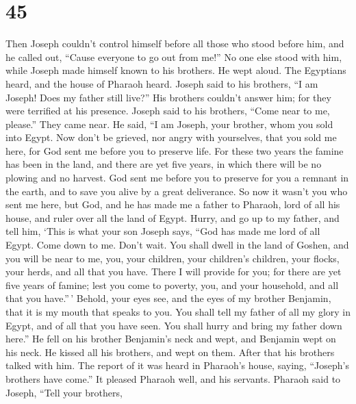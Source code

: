 \hypertarget{section-44}{%
\section{45}\label{section-44}}

 Then Joseph couldn't control himself before all those who
stood before him, and he called out, ``Cause everyone to go out from
me!'' No one else stood with him, while Joseph made himself known to his
brothers.  He wept aloud. The Egyptians heard, and the
house of Pharaoh heard.  Joseph said to his brothers, ``I
am Joseph! Does my father still live?'' His brothers couldn't answer
him; for they were terrified at his presence.  Joseph said
to his brothers, ``Come near to me, please.'' They came near. He said,
``I am Joseph, your brother, whom you sold into Egypt. 
Now don't be grieved, nor angry with yourselves, that you sold me here,
for God sent me before you to preserve life.  For these
two years the famine has been in the land, and there are yet five years,
in which there will be no plowing and no harvest.  God
sent me before you to preserve for you a remnant in the earth, and to
save you alive by a great deliverance.  So now it wasn't
you who sent me here, but God, and he has made me a father to Pharaoh,
lord of all his house, and ruler over all the land of Egypt.
 Hurry, and go up to my father, and tell him, `This is
what your son Joseph says, ``God has made me lord of all Egypt. Come
down to me. Don't wait.  You shall dwell in the land of
Goshen, and you will be near to me, you, your children, your children's
children, your flocks, your herds, and all that you have.
 There I will provide for you; for there are yet five
years of famine; lest you come to poverty, you, and your household, and
all that you have.''\,'  Behold, your eyes see, and the
eyes of my brother Benjamin, that it is my mouth that speaks to you.
 You shall tell my father of all my glory in Egypt, and
of all that you have seen. You shall hurry and bring my father down
here.''  He fell on his brother Benjamin's neck and wept,
and Benjamin wept on his neck.  He kissed all his
brothers, and wept on them. After that his brothers talked with him.
 The report of it was heard in Pharaoh's house, saying,
``Joseph's brothers have come.'' It pleased Pharaoh well, and his
servants.  Pharaoh said to Joseph, ``Tell your brothers,
